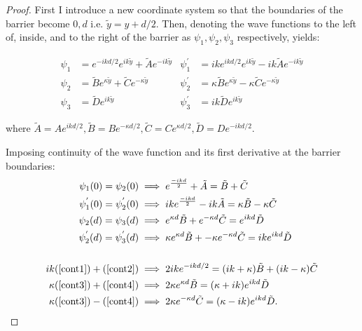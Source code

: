 \documentclass{article}
\begin{document}
\begin{proof}
	\noindent First I introduce a new coordinate system so that the boundaries of the barrier become $0,d \text{ i.e. } \tilde{y} = y+d/2$. Then, denoting the wave functions to the left of, inside, and to the right of the barrier as $\psi_{1}, \psi_{2}, \psi_{3}$ respectively, yields:

\begin{subequations}
\begin{align}
	\psi_{1} &= e^{-ikd/2}e^{ik\tilde{y}} + \tilde{A}e^{-ik\tilde{y}} & \psi_{1}^{'} &= ike^{ikd/2}e^{ik\tilde{y}} - ik\tilde{A}e^{-ik\tilde{y}} \\
	\psi_{2} &= \tilde{B}e^{\kappa\tilde{y}} + \tilde{C}e^{-\kappa\tilde{y}} & \psi_{2}^{'} &= \kappa\tilde{B}e^{\kappa\tilde{y}} -\kappa \tilde{C}e^{-\kappa \tilde{y}} \\
	\psi_{3} &= \tilde{D}e^{ik\tilde{y}} & \psi_{3}^{'} &= ik\tilde{D}e^{ik\tilde{y}}
\end{align}
\label{wavefunctions2}
\end{subequations}

\noindent where $\tilde{A} = Ae^{ikd/2}, \tilde{B} = Be^{-\kappa d/2}, \tilde{C} = Ce^{\kappa d/2}, \tilde{D} = De^{-ikd/2}$.

\noindent Imposing continuity of the wave function and its first derivative at the barrier boundaries:
\begin{subequations}
\begin{align}
	\psi_{1}(0) = \psi_{2}(0) &\implies e^{\frac{-ikd}{2}}+\tilde{A} = \tilde{B}+\tilde{C} \label{cont1}\\
	\psi_{1}^{'}(0) = \psi_{2}^{'}(0) &\implies ike^{\frac{-ikd}{2}} - ik\tilde{A} = \kappa \tilde{B} - \kappa \tilde{C} \label{cont2}\\
	\psi_{2}(d) = \psi_{3}(d) &\implies e^{\kappa d}\tilde{B} + e^{-\kappa d}\tilde{C} = e^{ikd}\tilde{D} \label{cont3}\\
	\psi_{2}^{'}(d) = \psi_{3}^{'}(d) &\implies \kappa e^{\kappa d}\tilde{B} + -\kappa e^{-\kappa d}\tilde{C} = ike^{ikd}\tilde{D} \label{cont4}\\
	\\
	ik(\ref{cont1})+(\ref{cont2}) &\implies 2ike^{-ikd/2} = (ik+\kappa)\tilde{B}+(ik-\kappa)\tilde{C} \label{cont5}\\
	\kappa(\ref{cont3})+(\ref{cont4}) &\implies 2\kappa e^{\kappa d}\tilde{B} = (\kappa+ik)e^{ikd}\tilde{D} \label{cont7}\\
	\kappa(\ref{cont3})-(\ref{cont4}) &\implies 2\kappa e^{-\kappa d}\tilde{C} = (\kappa-ik)e^{ikd}\tilde{D} \label{cont8}.
	\end{align}
\end{subequations}


\end{proof}
\end{document}
